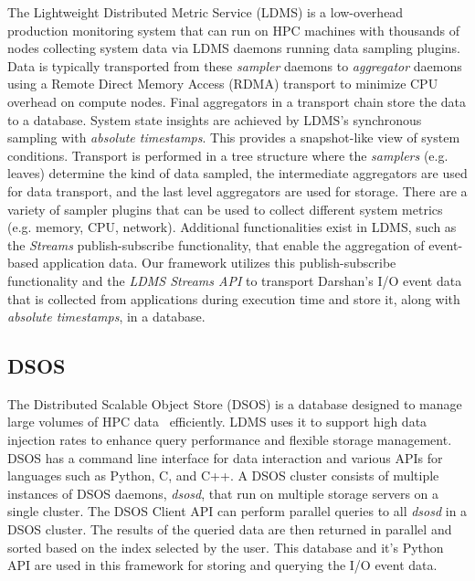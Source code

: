 The Lightweight Distributed Metric Service (LDMS) is a low-overhead production 
monitoring system that can run on HPC machines with thousands of nodes collecting 
system data via LDMS daemons running data sampling plugins.
Data is typically transported from these \emph{sampler} daemons to \emph{aggregator} 
daemons using a Remote Direct Memory Access (RDMA) transport to minimize CPU 
overhead on compute nodes. Final aggregators in a transport chain store
the data to a database.
System state insights are achieved by LDMS's synchronous sampling with 
\emph{absolute timestamps}. This provides a snapshot-like view of system conditions.
Transport is performed in a tree structure where the \emph{samplers} (e.g. leaves) 
determine the kind of data sampled, the intermediate aggregators are used for data 
transport, and the last level aggregators are used for storage. There are a variety 
of sampler plugins that can be used to collect different system metrics 
(e.g. memory, CPU, network).
Additional functionalities exist in LDMS, such as the \emph{Streams} publish-subscribe
functionality, that enable the aggregation of event-based application data. Our framework 
utilizes this publish-subscribe functionality and the \emph{LDMS Streams API} to 
transport Darshan's I/O event data that is collected from applications during 
execution time and store it, along with \emph{absolute timestamps}, in a database.

\subsection{DSOS}
The Distributed Scalable Object Store (DSOS) is a database designed to manage large 
volumes of HPC data~\cite{sosgithub} efficiently. LDMS uses it to support high 
data injection rates to enhance query performance and flexible storage management. 
DSOS has a command line interface for data interaction and various APIs for 
languages such as Python, C, and C++. A DSOS cluster consists of multiple 
instances of DSOS daemons, \emph{dsosd}, that run on multiple storage servers 
on a single cluster. The DSOS Client API can perform parallel queries to all 
\emph{dsosd} in a DSOS cluster. The results of the queried data are then returned 
in parallel and sorted based on the index selected by the user. This database and 
it's Python API are used in this framework for storing and querying the I/O event data. 
